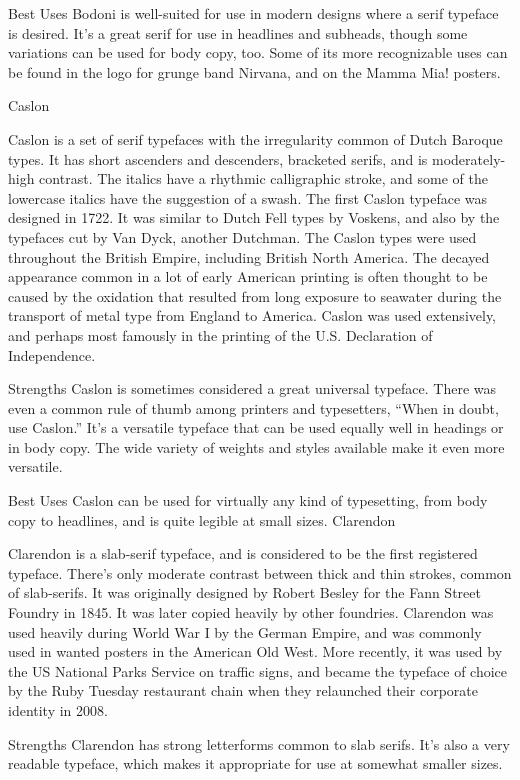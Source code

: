 \documentclass[12pt,a4paper,twocolumn]{book} %
\begin{document}
Best Uses
Bodoni is well-suited for use in modern designs where a serif typeface is desired. It’s a great serif for use in headlines and subheads, though some variations can be used for body copy, too. Some of its more recognizable uses can be found in the logo for grunge band Nirvana, and on the Mamma Mia! posters.

 
Caslon

Caslon is a set of serif typefaces with the irregularity common of Dutch Baroque types. It has short ascenders and descenders, bracketed serifs, and is moderately-high contrast. The italics have a rhythmic calligraphic stroke, and some of the lowercase italics have the suggestion of a swash.
The first Caslon typeface was designed in 1722. It was similar to Dutch Fell types by Voskens, and also by the typefaces cut by Van Dyck, another Dutchman. The Caslon types were used throughout the British Empire, including British North America. The decayed appearance common in a lot of early American printing is often thought to be caused by the oxidation that resulted from long exposure to seawater during the transport of metal type from England to America. Caslon was used extensively, and perhaps most famously in the printing of the U.S. Declaration of Independence.

Strengths
Caslon is sometimes considered a great universal typeface. There was even a common rule of thumb among printers and typesetters, “When in doubt, use Caslon.” It’s a versatile typeface that can be used equally well in headings or in body copy. The wide variety of weights and styles available make it even more versatile.

Best Uses
Caslon can be used for virtually any kind of typesetting, from body copy to headlines, and is quite legible at small sizes.
Clarendon

Clarendon is a slab-serif typeface, and is considered to be the first registered typeface. There’s only moderate contrast between thick and thin strokes, common of slab-serifs. It was originally designed by Robert Besley for the Fann Street Foundry in 1845. It was later copied heavily by other foundries.
Clarendon was used heavily during World War I by the German Empire, and was commonly used in wanted posters in the American Old West. More recently, it was used by the US National Parks Service on traffic signs, and became the typeface of choice by the Ruby Tuesday restaurant chain when they relaunched their corporate identity in 2008.

Strengths
Clarendon has strong letterforms common to slab serifs. It’s also a very readable typeface, which makes it appropriate for use at somewhat smaller sizes.
\end{document}
